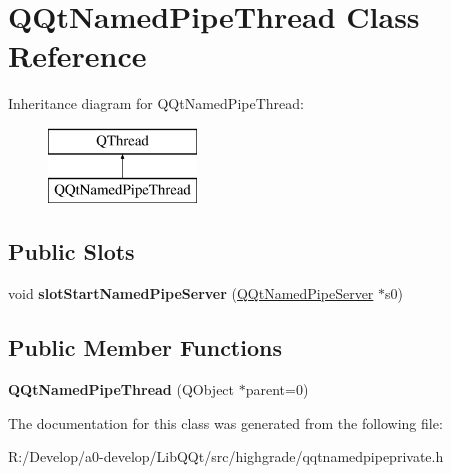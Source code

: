 \hypertarget{class_q_qt_named_pipe_thread}{}\section{Q\+Qt\+Named\+Pipe\+Thread Class Reference}
\label{class_q_qt_named_pipe_thread}
Inheritance diagram for Q\+Qt\+Named\+Pipe\+Thread\+:\begin{figure}[H]
\begin{center}
\leavevmode
\includegraphics[height=2.000000cm]{class_q_qt_named_pipe_thread}
\end{center}
\end{figure}
\subsection*{Public Slots}
\begin{DoxyCompactItemize}
\item 
\mbox{\label{class_q_qt_named_pipe_thread_a43f1e04ea6356ece797084684130294d}} 
void {\bfseries slot\+Start\+Named\+Pipe\+Server} (\mbox{\hyperlink{class_q_qt_named_pipe_server}{Q\+Qt\+Named\+Pipe\+Server}} $\ast$s0)
\end{DoxyCompactItemize}
\subsection*{Public Member Functions}
\begin{DoxyCompactItemize}
\item 
\mbox{\label{class_q_qt_named_pipe_thread_a5d34c2b35bbcd4384312704eb5783f9f}} 
{\bfseries Q\+Qt\+Named\+Pipe\+Thread} (Q\+Object $\ast$parent=0)
\end{DoxyCompactItemize}


The documentation for this class was generated from the following file\+:\begin{DoxyCompactItemize}
\item 
R\+:/\+Develop/a0-\/develop/\+Lib\+Q\+Qt/src/highgrade/qqtnamedpipeprivate.\+h\end{DoxyCompactItemize}
